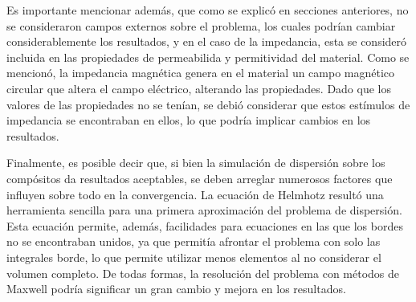 \documentclass[12pt,letterpaper]{article}
\numberwithin{equation}{section}
\begin{document}
Es importante mencionar además, que como se explicó en secciones anteriores, no se consideraron campos externos sobre el problema, los cuales podrían cambiar considerablemente los resultados, y en el caso de la impedancia, esta se consideró incluida en las propiedades de permeabilida y permitividad del material. Como se mencionó, la impedancia magnética genera en el material un campo magnético circular que altera el campo eléctrico, alterando las propiedades. Dado que los valores de las propiedades no se tenían, se debió considerar que estos estímulos de impedancia se encontraban en ellos, lo que podría implicar cambios en los resultados.

Finalmente, es posible decir que, si bien la simulación de dispersión sobre los compósitos da resultados aceptables, se deben arreglar numerosos factores que influyen sobre todo en la convergencia. La ecuación de Helmhotz resultó una herramienta sencilla para una primera aproximación del problema de dispersión. Esta ecuación permite, además, facilidades para ecuaciones en las que los bordes no se encontraban unidos, ya que permitía afrontar el problema con solo las integrales borde, lo que permite utilizar menos elementos al no considerar el volumen completo. De todas formas, la resolución del problema con métodos de Maxwell podría significar un gran cambio y mejora en los resultados.
\pagebreak
{}%
\end{document}
